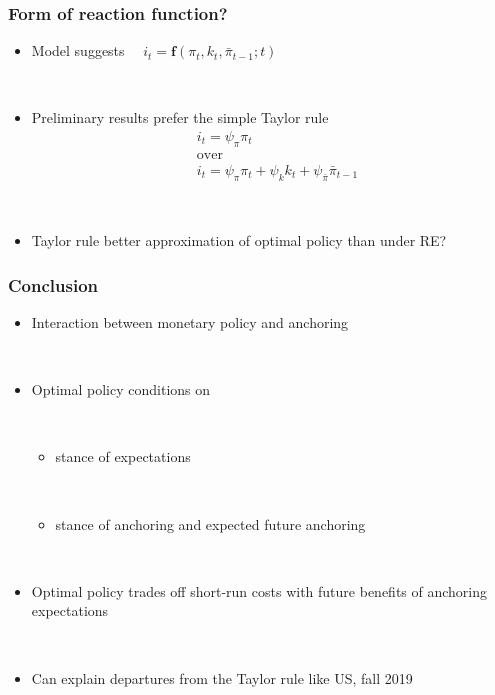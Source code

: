 \documentclass[11pt]{beamer}
\begin{document}
\begin{frame}
	\frametitle{Form of reaction function?}
	
\begin{itemize}
\item Model suggests $\quad i_t = \mathbf{f}(\pi_t, k_{t}, \bar{\pi}_{t-1}; t)$

\

\item Preliminary results prefer the simple Taylor rule 
\begin{align*}
&i_t = \psi_{\pi}\pi_t \\
& \text{over} \\
& i_t = \psi_{\pi}\pi_t + \psi_k k_t + \psi_{\bar{\pi}}\bar{\pi}_{t-1}
\end{align*}

\

\item Taylor rule better approximation of optimal policy than under RE?
\end{itemize}
	

\end{frame}

\begin{frame}
	\frametitle{Conclusion}
	
\begin{itemize}
\item Interaction between monetary policy and anchoring 

\

\item Optimal policy conditions on

\

\begin{itemize}

\item stance of expectations 

\

\item stance of anchoring and expected future anchoring
\end{itemize}

\

\item Optimal policy trades off short-run costs with future benefits of anchoring expectations

\

\item Can explain departures from the Taylor rule like US, fall 2019
\end{itemize}


\end{frame}
\end{document}
